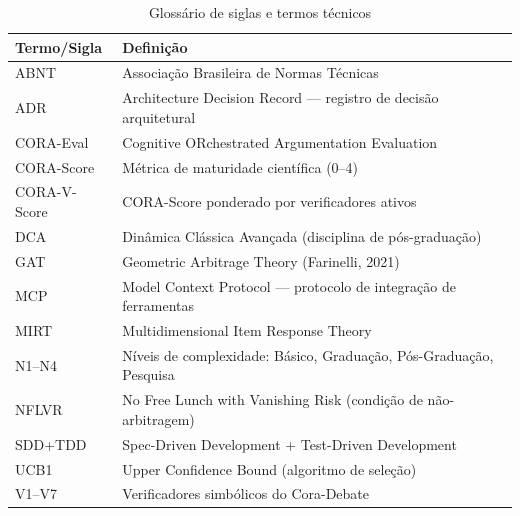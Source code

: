 \begin{table}[H]\centering\footnotesize
\caption{Glossário de siglas e termos técnicos}
\label{tab:glossario}
\begin{tabular}{p{}p{}}
\toprule
\textbf{Termo/Sigla} & \textbf{Definição} \\
\midrule
ABNT & Associação Brasileira de Normas Técnicas \\
ADR & Architecture Decision Record --- registro de decisão arquitetural \\
CORA-Eval & Cognitive ORchestrated Argumentation Evaluation \\
CORA-Score & Métrica de maturidade científica (0--4) \\
CORA-V-Score & CORA-Score ponderado por verificadores ativos \\
DCA & Dinâmica Clássica Avançada (disciplina de pós-graduação) \\
GAT & Geometric Arbitrage Theory (Farinelli, 2021) \\
MCP & Model Context Protocol --- protocolo de integração de ferramentas \\
MIRT & Multidimensional Item Response Theory \\
N1--N4 & Níveis de complexidade: Básico, Graduação, Pós-Graduação, Pesquisa \\
NFLVR & No Free Lunch with Vanishing Risk (condição de não-arbitragem) \\
SDD+TDD & Spec-Driven Development + Test-Driven Development \\
UCB1 & Upper Confidence Bound (algoritmo de seleção) \\
V1--V7 & Verificadores simbólicos do Cora-Debate \\
\bottomrule
\end{tabular}
\end{table}
